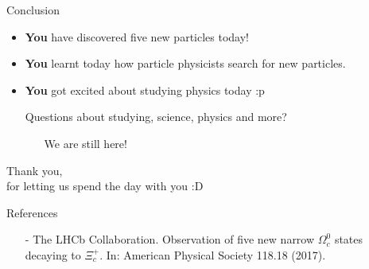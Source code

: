 
\begin{frame}{Conclusion}
    \begin{itemize}
        \item \textbf{You} have discovered five new particles today!
        \item \textbf{You} learnt today how particle physicists search for new particles.
        \item \textbf{You} got excited about studying physics today :p
        \vspace{0.5cm}
        \item[] Questions about studying, science, physics and more? 
        \begin{itemize}
            \item[\ding{43}] We are still here!
        \end{itemize}
    \end{itemize}
\end{frame}
\begin{frame}
\begin{center}
\Huge{Thank you}\normalsize, \\
 for letting us spend the day with you :D
\end{center}
\end{frame}
\begin{frame}{References}
    \begin{itemize}\footnotesize
        \item [-] The LHCb Collaboration. Observation of five new narrow $\Omega_c^0$ states decaying to $\Xi_c^+$. In: American Physical Society 118.18 (2017).
    \end{itemize}
\end{frame}

